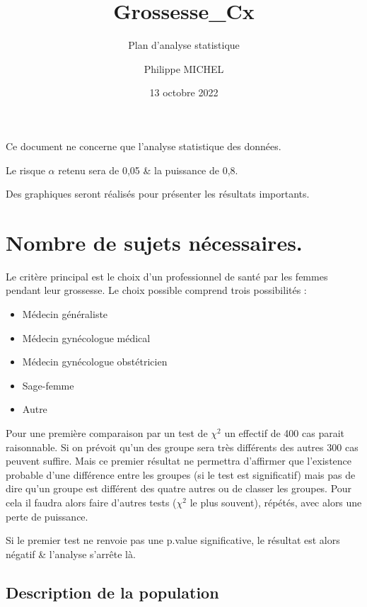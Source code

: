 \documentclass[
  a4paperpaper,
  french]{scrartcl}
\title{Grossesse\_Cx}
\subtitle{Plan d'analyse statistique}
\author{Philippe MICHEL}
\date{13 octobre 2022}
\providecommand{\tightlist}{%
  \setlength{\itemsep}{0pt}\setlength{\parskip}{0pt}}\usepackage{longtable,booktabs,array}
\begin{document}
\maketitle
\ifdefined\Shaded\renewenvironment{Shaded}{\begin{tcolorbox}[interior hidden, enhanced, breakable, borderline west={3pt}{0pt}{shadecolor}, sharp corners, frame hidden, boxrule=0pt]}{\end{tcolorbox}}\fi

Ce document ne concerne que l'analyse statistique des données.

Le risque \(\alpha\) retenu sera de 0,05 \& la puissance de 0,8.

Des graphiques seront réalisés pour présenter les résultats importants.

\hypertarget{nombre-de-sujets-nuxe9cessaires.}{%
\section{Nombre de sujets
nécessaires.}\label{nombre-de-sujets-nuxe9cessaires.}}

Le critère principal est le choix d'un professionnel de santé par les
femmes pendant leur grossesse. Le choix possible comprend trois
possibilités :

\begin{itemize}
\tightlist
\item
  Médecin généraliste
\item
  Médecin gynécologue médical
\item
  Médecin gynécologue obstétricien
\item
  Sage-femme
\item
  Autre
\end{itemize}

Pour une première comparaison par un test de \(\chi^2\) un effectif de
400 cas parait raisonnable. Si on prévoit qu'un des groupe sera très
différents des autres 300 cas peuvent suffire. Mais ce premier résultat
ne permettra d'affirmer que l'existence probable d'une différence entre
les groupes (si le test est significatif) mais pas de dire qu'un groupe
est différent des quatre autres ou de classer les groupes. Pour cela il
faudra alors faire d'autres tests (\(\chi^2\) le plus souvent), répétés,
avec alors une perte de puissance.

Si le premier test ne renvoie pas une p.value significative, le résultat
est alors négatif \& l'analyse s'arrête là.

\hypertarget{description-de-la-population}{%
\subsection{Description de la
population}\label{description-de-la-population}}
\end{document}
